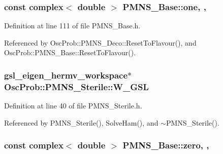 \subsubsection[{\texorpdfstring{one}{one}}]{\setlength{\rightskip}{0pt plus 5cm}const {\bf complex}$<$ double $>$ P\+M\+N\+S\+\_\+\+Base\+::one\hspace{0.3cm}{\ttfamily [static]}, {\ttfamily [protected]}, {\ttfamily [inherited]}}\hypertarget{classOscProb_1_1PMNS__Base_ab64aab27448a5aca27565c991a9d173e}{}\label{classOscProb_1_1PMNS__Base_ab64aab27448a5aca27565c991a9d173e}


Definition at line 111 of file P\+M\+N\+S\+\_\+\+Base.\+h.



Referenced by Osc\+Prob\+::\+P\+M\+N\+S\+\_\+\+Deco\+::\+Reset\+To\+Flavour(), and Osc\+Prob\+::\+P\+M\+N\+S\+\_\+\+Base\+::\+Reset\+To\+Flavour().

\subsubsection[{\texorpdfstring{W\+\_\+\+G\+SL}{W_GSL}}]{\setlength{\rightskip}{0pt plus 5cm}gsl\+\_\+eigen\+\_\+hermv\+\_\+workspace$\ast$ Osc\+Prob\+::\+P\+M\+N\+S\+\_\+\+Sterile\+::\+W\+\_\+\+G\+SL\hspace{0.3cm}{\ttfamily [protected]}}\hypertarget{classOscProb_1_1PMNS__Sterile_a4e8aed8fd29297e4833488572c9a4eb1}{}\label{classOscProb_1_1PMNS__Sterile_a4e8aed8fd29297e4833488572c9a4eb1}


Definition at line 40 of file P\+M\+N\+S\+\_\+\+Sterile.\+h.



Referenced by P\+M\+N\+S\+\_\+\+Sterile(), Solve\+Ham(), and $\sim$\+P\+M\+N\+S\+\_\+\+Sterile().

\subsubsection[{\texorpdfstring{zero}{zero}}]{\setlength{\rightskip}{0pt plus 5cm}const {\bf complex}$<$ double $>$ P\+M\+N\+S\+\_\+\+Base\+::zero\hspace{0.3cm}{\ttfamily [static]}, {\ttfamily [protected]}, {\ttfamily [inherited]}}\hypertarget{classOscProb_1_1PMNS__Base_a5c31ed4593cf95feb36fb80c1850d25e}{}\label{classOscProb_1_1PMNS__Base_a5c31ed4593cf95feb36fb80c1850d25e}


